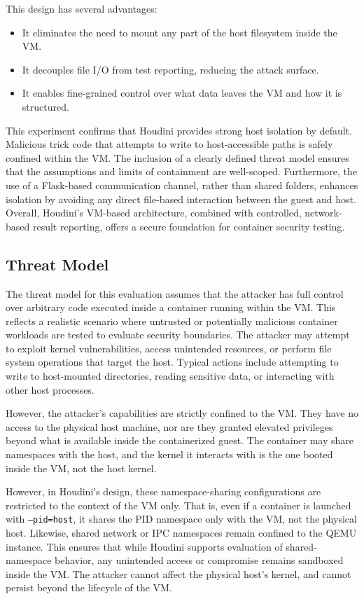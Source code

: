 \documentclass[12pt]{report}
\begin{document}
\begin{doublespace}
This design has several advantages:
\begin{itemize}
    \item It eliminates the need to mount any part of the host filesystem inside the VM.
    \item It decouples file I/O from test reporting, reducing the attack surface.
    \item It enables fine-grained control over what data leaves the VM and how it is structured.
\end{itemize}


This experiment confirms that Houdini provides strong host isolation by default. Malicious trick code that attempts to write to host-accessible paths is safely confined within the VM. The inclusion of a clearly defined threat model ensures that the assumptions and limits of containment are well-scoped. Furthermore, the use of a Flask-based communication channel, rather than shared folders, enhances isolation by avoiding any direct file-based interaction between the guest and host. Overall, Houdini’s VM-based architecture, combined with controlled, network-based result reporting, offers a secure foundation for container security testing.


\subsection{Threat Model}

The threat model for this evaluation assumes that the attacker has full control over arbitrary code executed inside a container running within the VM. This reflects a realistic scenario where untrusted or potentially malicious container workloads are tested to evaluate security boundaries. The attacker may attempt to exploit kernel vulnerabilities, access unintended resources, or perform file system operations that target the host. Typical actions include attempting to write to host-mounted directories, reading sensitive data, or interacting with other host processes.

However, the attacker’s capabilities are strictly confined to the VM. They have no access to the physical host machine, nor are they granted elevated privileges beyond what is available inside the containerized guest. The container may share namespaces with the host, and the kernel it interacts with is the one booted inside the VM, not the host kernel.

However, in Houdini’s design, these namespace-sharing configurations are restricted to the context of the VM only. That is, even if a container is launched with \texttt{--pid=host}, it shares the PID namespace only with the VM, not the physical host. Likewise, shared network or IPC namespaces remain confined to the QEMU instance. This ensures that while Houdini supports evaluation of shared-namespace behavior, any unintended access or compromise remains sandboxed inside the VM. The attacker cannot affect the physical host’s kernel, and cannot persist beyond the lifecycle of the VM.


\end{doublespace}
\end{document}
